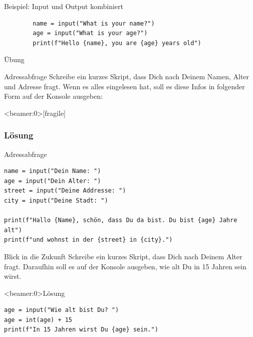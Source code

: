 \begin{fragile}[]
	\begin{exampleblock}{Beispiel: Input und Output kombiniert}
		\begin{verbatim}
		name = input("What is your name?")
		age = input("What is your age?")
		print(f"Hello {name}, you are {age} years old") 
		\end{verbatim}
	\end{exampleblock}
\end{fragile}

\begin{frame}{Übung}
\begin{block}{Adressabfrage}
\vspace{2pt}
Schreibe ein kurzes Skript, dass Dich nach Deinem Namen, Alter und Adresse fragt. Wenn es alles eingelesen hat, soll es diese Infos in folgender Form auf der Konsole ausgeben: 	

\end{block}
\end{frame}

\begin{frame}<beamer:0>[fragile]
\frametitle{Lösung}
\begin{solutionblock}{Adressabfrage}
\begin{verbatim}
name = input("Dein Name: ")
age = input("Dein Alter: ")
street = input("Deine Addresse: ")
city = input("Deine Stadt: ") 

print(f"Hallo {Name}, schön, dass Du da bist. Du bist {age} Jahre alt")
print(f"und wohnst in der {street} in {city}.")
\end{verbatim}
\end{solutionblock}
\end{frame}



\begin{fragile}[Übung]
\begin{block}{Blick in die Zukunft}
	\vspace{2pt}
Schreibe ein kurzes Skript, dass Dich nach Deinem Alter fragt. Daraufhin soll es auf der Konsole ausgeben, wie alt Du in 15 Jahren sein wirst. 
\end{block}
\vspace{12pt}
\begin{solutionblock}<beamer:0>{Lösung}
\begin{verbatim}
age = input("Wie alt bist Du? ")
age = int(age) + 15
print(f"In 15 Jahren wirst Du {age} sein.")
\end{verbatim}
\end{solutionblock}
\end{fragile}


